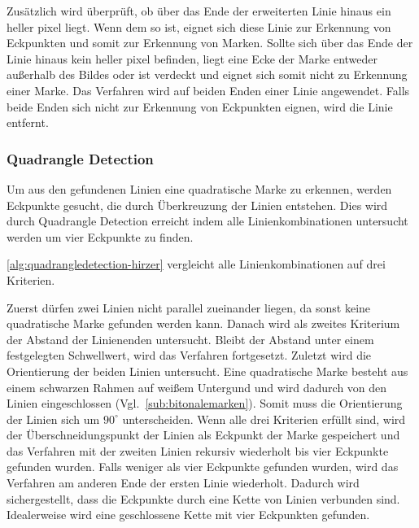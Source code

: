 Zusätzlich wird überprüft, ob über das Ende der erweiterten Linie hinaus ein heller \gls{pixel} liegt. Wenn dem so ist,
 eignet sich diese Linie zur Erkennung von Eckpunkten und somit zur Erkennung von Marken. Sollte sich über das Ende der
 Linie hinaus kein heller \gls{pixel} befinden, liegt eine Ecke der Marke entweder außerhalb des Bildes oder ist
 verdeckt und eignet sich somit nicht zu Erkennung einer Marke. Das Verfahren wird auf beiden Enden einer Linie
 angewendet. Falls beide Enden sich nicht zur Erkennung von Eckpunkten eignen, wird die Linie entfernt.

\subsubsection{Quadrangle Detection} %
\label{sub:quadrangle_detection}

Um aus den gefundenen Linien eine quadratische Marke zu erkennen, werden Eckpunkte gesucht, die durch Überkreuzung der
 Linien entstehen. Dies wird durch Quadrangle Detection erreicht indem alle Linienkombinationen untersucht werden um
 vier Eckpunkte zu finden.

\autoref{alg:quadrangledetection-hirzer} vergleicht alle Linienkombinationen auf drei Kriterien.

Zuerst dürfen zwei Linien nicht parallel zueinander liegen, da sonst keine quadratische Marke gefunden werden kann.
 Danach wird als zweites Kriterium der Abstand der Linienenden untersucht. Bleibt der Abstand unter einem festgelegten
 Schwellwert, wird das Verfahren fortgesetzt. Zuletzt wird die Orientierung der beiden Linien untersucht. Eine
 quadratische Marke besteht aus einem schwarzen Rahmen auf weißem Untergund und wird dadurch von den Linien
 eingeschlossen (Vgl.~\autoref{sub:bitonalemarken}). Somit muss die Orientierung der Linien sich um $90^\circ$
 unterscheiden. Wenn alle drei Kriterien erfüllt sind, wird der Überschneidungspunkt der Linien als Eckpunkt der Marke
 gespeichert und das Verfahren mit der zweiten Linien rekursiv wiederholt bis vier Eckpunkte gefunden wurden. Falls
 weniger als vier Eckpunkte gefunden wurden, wird das Verfahren am anderen Ende der ersten Linie wiederholt. Dadurch
 wird sichergestellt, dass die Eckpunkte durch eine Kette von Linien verbunden sind. Idealerweise wird eine
 geschlossene Kette mit vier Eckpunkten gefunden.

